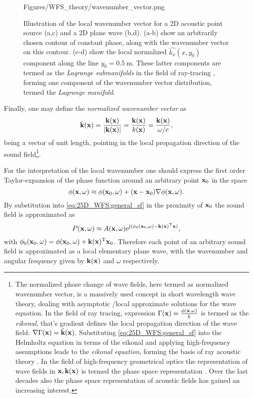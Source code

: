 \begin{figure}[h!]
	\centering
	\begin{overpic}[width = .9\columnwidth]{Figures/WFS_theory/wavenumber_vector.png}
	\end{overpic}
	\caption{Illustration of the local wavenumber vector for a 2D acoustic point source (a,c) and a 2D plane wave (b,d). (a-b) show an arbitrarily chosen contour of constant phase, along with the wavenumber vector on this contour. (c-d) show the local normalized $\hat{k_x}(x,y_0)$ component along the line $y_0 = 0.5 ~\mathrm{m}$. These latter components are termed as the \emph{Lagrange submanifolds} in the field of ray-tracing \cite{Tracy2014}, forming one component of the wavenumber vector distribution, termed the \emph{Lagrange manifold}.}
	\label{Fig:Theory:general_sfs_geometry}
\end{figure}

Finally, one may define the \emph{normalized wavenumber vector} as
\begin{equation}
\hat{\mathbf{k}}(\mathbf{x}) = \frac{\mathbf{k}(\mathbf{x})}{|\mathbf{k}(\mathbf{x})|} = \frac{\mathbf{k}(\mathbf{x})}{k(\mathbf{x})} = \frac{\mathbf{k}(\mathbf{x})}{\omega/c},
\end{equation}
being a vector of unit length, pointing in the local propagation direction of the sound field\footnote{The normalized phase change of wave fields, here termed as normalized wavenumber vector, is a massively used concept in short wavelength wave theory, dealing with asymptotic /local approximate solutions for the wave equation.
In the field of ray tracing, expression $\Gamma(\mathbf{x}) = \frac{\phi(\mathbf{x},\omega)}{k}$ is termed as the \emph{eikonal}, that's gradient defines the local propagation direction of the wave field: $\nabla \Gamma(\mathbf{x}) = \hat{\mathbf{k}}(\mathbf{x})$. Substituting \eqref{eq:25D_WFS:general_sf} into the Helmholtz equation in terms of the eikonal and applying high-frequency assumptions leads to the \emph{eikonal equation}, forming the basis of ray acoustic theory \cite{Kinsler2000}.
In the field of high-frequency geometrical optics the representation of wave fields in $\mathbf{x}, \mathbf{k}(\mathbf{x})$ is termed the phase space representation \cite{Arnold1995}. Over the last decades also the phase space representation of acoustic fields has gained an increasing interest\cite{Steinberg1993, Teyssandier2005}.}.

For the interpretation of the local wavenumber one should express the first order Taylor-expansion of the phase function around an arbitrary point $\mathbf{x}_0$ in the space
\begin{equation}
\phi(\mathbf{x},\omega) \approx \phi(\mathbf{x}_0,\omega) + (\mathbf{x}-\mathbf{x}_0) \nabla \phi(\mathbf{x},\omega).
\end{equation}
By substitution into \eqref{eq:25D_WFS:general_sf} in the proximity of $\mathbf{x}_0$ the sound field is approximated as
\begin{equation}
P(\mathbf{x},\omega) \approx A(\mathbf{x},\omega) \mathrm{e}^{\mathrm{j} ( \phi_0(\mathbf{x}_0,\omega) - \mathbf{k}(\mathbf{x})^{\mathrm{T}} \mathbf{x} )},
\end{equation}
with $\phi_0(\mathbf{x}_0,\omega) = \phi(\mathbf{x}_0,\omega) + \mathbf{k}(\mathbf{x})^{\mathrm{T}} \mathbf{x}_0 $. Therefore each point of an arbitrary sound field is approximated as a local elementary plane wave, with the wavenumber and angular frequency given by $\mathbf{k}(\mathbf{x})$ and $\omega$ respectively.

